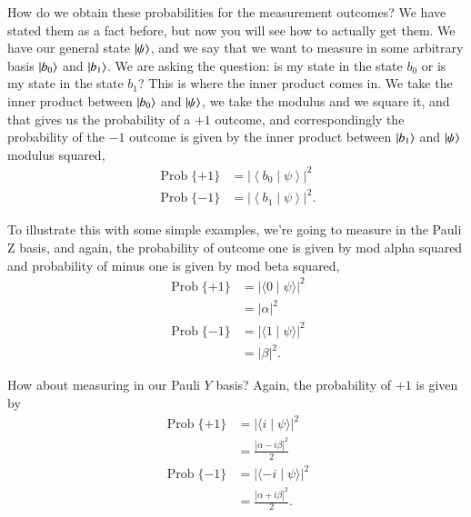 How do we obtain these probabilities for the measurement outcomes? We have stated them as a fact before, but now you will see how to actually get them. We have our general state $\left| \psi \right\rangle$, and we say that we want to measure in some arbitrary basis $\left| b_0 \right\rangle$ and $\left| b_1 \right\rangle$. We are asking the question: is my state in the state $b_0$ or is my state in the state $b_1$? This is where the inner product comes in. We take the inner product between $\left| b_0 \right\rangle$ and $\left| \psi \right\rangle$, we take the modulus and we square it, and that gives us the probability of a $+1$ outcome, and correspondingly the probability of the $-1$ outcome is given by the inner product between $\left| b_1 \right\rangle$ and $\left| \psi \right\rangle$ modulus squared,
\begin{equation}
\begin{aligned}
\operatorname{Prob}\{+1\}&=\left|\left\langle b_{0}\mid \psi\right\rangle\right|^{2} \\
\operatorname{Prob}\{-1\}&=\left|\left\langle b_{1}\mid \psi\right\rangle\right|^{2}.
\end{aligned}
\end{equation}

To illustrate this with some simple examples, we're going to measure in the Pauli Z basis, and again, the probability of outcome one is given by mod alpha squared and probability of minus one is given by mod beta squared,
\begin{equation}
\begin{aligned}
\operatorname{Prob}\{+1\} &=|\langle 0 \mid \psi\rangle|^2 \\
&=|\alpha|^2 \\
\operatorname{Prob}\{-1\} &=|\langle 1 \mid \psi\rangle|^2 \\
&=|\beta|^2.
\end{aligned}
\end{equation}

How about measuring in our Pauli $Y$ basis? Again, the probability of $+1$ is given by
\begin{equation}
\begin{aligned}
\operatorname{Prob}\{+1\} &=|\langle i \mid \psi\rangle|^2 \\
&=\frac{|\alpha-i \beta|^2}{2} \\
\operatorname{Prob}\{-1\} &=|\langle-i \mid \psi\rangle|^2 \\
&=\frac{|\alpha+i \beta|^2}{2}.
\end{aligned}
\end{equation}

